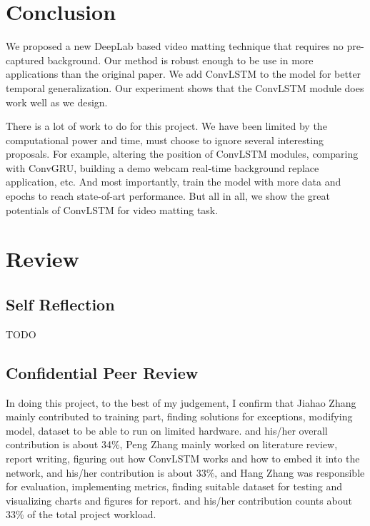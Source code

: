 \documentclass[final]{cvpr}
\begin{document}
\section{Conclusion}

We proposed a new DeepLab based video matting technique that requires no pre-captured background.
Our method is robust enough to be use in more applications than the original paper.
We add ConvLSTM to the model for better temporal generalization.
Our experiment shows that the ConvLSTM module does work well as we design.

There is a lot of work to do for this project.
We have been limited by the computational power and time, must choose to ignore several interesting proposals.
For example, altering the position of ConvLSTM modules, comparing with ConvGRU, building a demo webcam real-time background replace application, etc.
And most importantly, train the model with more data and epochs to reach state-of-art performance.
But all in all, we show the great potentials of ConvLSTM for video matting task.




\section{Review}

\subsection{Self Reflection}

TODO

\subsection{Confidential Peer Review}

In doing this project, to the best of my judgement,
I confirm that Jiahao Zhang mainly contributed to training part, finding solutions for exceptions, modifying model, dataset to be able to run on limited hardware.
and his/her overall contribution is about 34\%,
Peng Zhang mainly worked on literature review, report writing, figuring out how ConvLSTM works and how to embed it into the network,
and his/her contribution is about 33\%,
and Hang Zhang was responsible for evaluation, implementing metrics, finding suitable dataset for testing and visualizing charts and figures for report.
and his/her contribution counts about 33\% of the total project workload.
\end{document}
